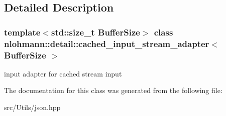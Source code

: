 \subsection{Detailed Description}
\subsubsection*{template$<$std\+::size\+\_\+t Buffer\+Size$>$\newline
class nlohmann\+::detail\+::cached\+\_\+input\+\_\+stream\+\_\+adapter$<$ Buffer\+Size $>$}

input adapter for cached stream input 

The documentation for this class was generated from the following file\+:\begin{DoxyCompactItemize}
\item 
src/\+Utils/json.\+hpp\end{DoxyCompactItemize}
